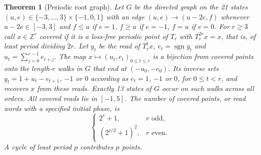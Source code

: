 \documentclass[11pt]{amsart}
\newtheorem{theorem}{Theorem}
\theoremstyle{definition}
\DeclareMathOperator{\sgn}{sgn}
\newcommand{\Z}{\mathbb Z}
\begin{document}
\begin{theorem}[Periodic root graph]\label{th:graph}
Let \(G\) be the directed graph on the 21 states
\((u,e)\in\{-3,\ldots,3\}\times\{-1,0,1\}\) with an edge
\((u,e)\to(u-2e,f)\) whenever \(u-2e\in[-3,3]\) and \(f\le u\) if
\(e=1\), \(f\ge u\) if \(e=-1\), \(f=u\) if \(e=0\). For \(r\ge3\) call
\(x\in\Z^r\) \emph{covered} if it is a loss-free periodic point of
\(T_r\) with \(T_r^{2r}x=x\), that is, of least period dividing \(2r\).
Let \(y_t\) be the read of \(T_r^tx\), \(e_t=\sgn y_t\) and
\(u_t=\sum_{j=0}^{r-1}e_{t+j}\). The map
\(x\mapsto(u_t,e_t)_{0\le t\le r}\) is a bijection from covered points
onto the length-\(r\) walks in \(G\) that end at \((-u_0,-e_0)\). Its
inverse sets \(y_t=1+u_t-e_{t+1}\), \(-1\) or \(0\) according as
\(e_t=1\), \(-1\) or \(0\), for \(0\le t<r\), and recovers \(x\) from
these reads. Exactly 13 states of \(G\) occur on such walks across all
orders. All covered reads lie in \([-1,5]\). The number of covered
points, or read words with a specified initial phase, is
\[
 \begin{cases}
 2^r+1,&r\text{ odd},\\
 (2^{r/2}+1)^2,&r\text{ even}.
 \end{cases}
\]
A cycle of least period \(p\) contributes \(p\) points.
\end{theorem}
\end{document}
